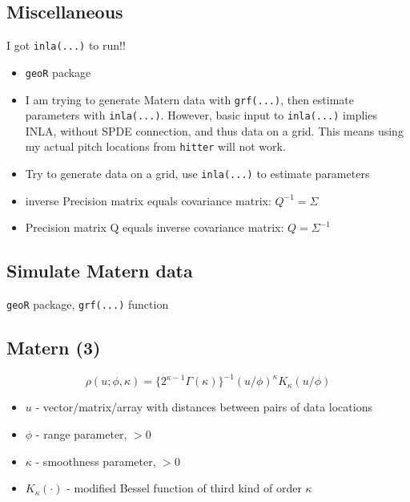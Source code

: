 \documentclass{article}
\begin{document}
\subsection*{Miscellaneous}
I got \verb|inla(...)| to run!!
\begin{itemize}
\item \verb|geoR| package
\item I am trying to generate Matern data with \verb|grf(...)|, then estimate parameters with \verb|inla(...)|. However, basic input to \verb|inla(...)| implies INLA, without SPDE connection, and thus data on a grid. This means using my actual pitch locations from \verb|hitter| will not work. \\
\item Try to generate data on a grid, use \verb|inla(...)| to estimate parameters
\item inverse Precision matrix equals covariance matrix: $Q^{-1} = \Sigma$
\item Precision matrix Q equals inverse covariance matrix: $Q = \Sigma^{-1}$
\end{itemize}

\subsection*{Simulate Matern data}
\verb|geoR| package, \verb|grf(...)| function
\subsection*{Matern (3)}
$$ \rho(u; \phi, \kappa) = \{2^{\kappa-1}\Gamma(\kappa)\}^{-1}(u/\phi)^{\kappa}K_{\kappa}(u/\phi)$$
  \begin{itemize}
  \item $u$ - vector/matrix/array with distances between pairs of data locations
  \item $\phi$ - range parameter, $>0$
  \item $\kappa$ - smoothness parameter, $>0$
  \item $K_{\kappa}(\cdot)$ - modified Bessel function of third kind of order $\kappa$
  \end{itemize}
\end{document}
